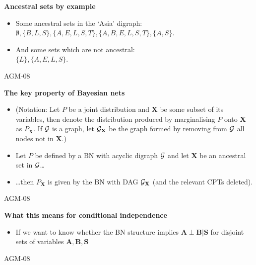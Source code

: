 \documentclass[landscape]{slides}
\newcommand{\lecnum}{AGM-08}
\newcommand{\slidehead}[1]{{\centering \bf #1 \\}}
\newenvironment{titledslide}[1]{\begin{slide}\slidehead{#1}\vfill}{\vfill \tiny \lecnum \end{slide}}
\newcommand{\gr}{\ensuremath{{\cal G}}}
\newcommand{\ci}[3]{\ensuremath{#1 \perp #2 | #3}}
\begin{document}
\begin{titledslide}{Ancestral sets by example}
  
  \begin{itemize}
  \item Some ancestral sets in the `Asia' digraph:\\ $\emptyset,
    \{B,L,S\}, \{A,E,L,S,T\}, \{A,B,E,L,S,T\}, \{A,S\}$.
  \item And some sets which are not ancestral:\\ $\{L\}, \{A,E,L,S\}$.
  \end{itemize}

\end{titledslide}
\begin{titledslide}{The key property of Bayesian nets}
  
  \begin{itemize}
  \item (Notation: Let $P$ be a joint distribution and $\mathbf{X}$ be
    some subset of its variables, then denote the distribution
    produced by marginalising $P$ onto $\mathbf{X}$ as
    $P_{\mathbf{X}}$. If \gr{} is a graph, let $\gr_{\mathbf{X}}$ be the
    graph formed by removing from \gr{} all nodes not in $\mathbf{X}$.)
  \item Let $P$ be defined by a BN with acyclic digraph \gr{} and let
    $\mathbf{X}$ be an ancestral set in \gr \dots
  \item \dots then $P_{\mathbf{X}}$ is given by the BN with DAG
    $\gr_{\mathbf{X}}$ (and the relevant CPTs deleted).
  \end{itemize}

\end{titledslide}
\begin{titledslide}{What this means for conditional independence}

  \begin{itemize}
  \item If we want to know whether the BN structure implies
    $\ci{\mathbf{A}}{\mathbf{B}}{\mathbf{S}}$ for disjoint sets of
    variables $\mathbf{A}, \mathbf{B}, \mathbf{S}$
  \end{itemize}
  
\end{titledslide}
\end{document}
